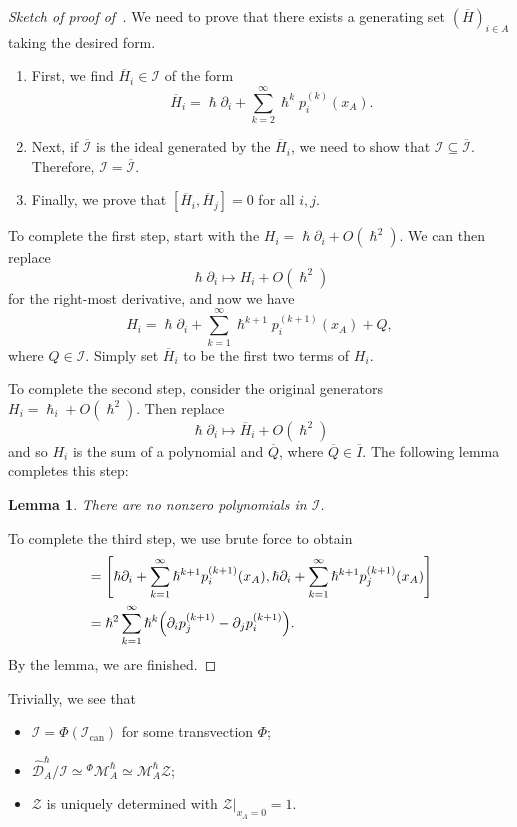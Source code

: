 \documentclass[leqno, openany]{memoir}
\newtheorem{lem}[thm]{Lemma}
\theoremstyle{definition}
\theoremstyle{remark}
\theoremstyle{plain}
\theoremstyle{definition}
\theoremstyle{remark}
\newcommand{\mc}[1]{\mathcal{#1}}
\newcommand{\mr}[1]{\mathrm{#1}}
\newcommand{\ol}[1]{\overline{#1}}
\newcommand{\wh}[1]{\widehat{#1}}
\begin{document}
\begin{proof}[Sketch of proof of~]
    We need to prove that there exists a generating set $(\ol{H})_{i \in A}$ taking the desired form.
    \begin{enumerate}
        \item First, we find $\ol{H}_i \in \mc{I}$ of the form
            \[ \ol{H}_i = \hslash \partial_i + \sum_{k=2}^{\infty} \hslash^k p_i^{(k)}(x_A). \]
        \item Next, if $\ol{\mc{I}}$ is the ideal generated by the $\ol{H}_i$, we need to show that $\mc{I} \subseteq \ol{\mc{I}}$. Therefore, $\mc{I} = \ol{\mc{I}}$.
        \item Finally, we prove that $[\ol{H}_i, \ol{H}_j] = 0$ for all $i, j$.
    \end{enumerate}

    To complete the first step, start with the $H_i = \hslash \partial_i + O(\hslash^2)$. We can then replace
    \[ \hslash \partial_i \mapsto H_i + O(\hslash^2) \]
    for the right-most derivative, and now we have
    \[ H_i = \hslash \partial_i + \sum_{k=1}^{\infty} \hslash^{k+1} p_i^{(k+1)}(x_A) + Q, \]
    where $Q \in \mc{I}$. Simply set $\ol{H}_i$ to be the first two terms of $H_i$.

    To complete the second step, consider the original generators $H_i = \hslash_i + O(\hslash^2)$. Then replace
    \[ \hslash \partial_i \mapsto \ol{H}_i + O(\hslash^2) \]
    and so $H_i$ is the sum of a polynomial and $\ol{Q}$, where $\ol{Q} \in \ol{I}$. The following lemma completes this step:
    \begin{lem}
        There are no nonzero polynomials in $\mc{I}$.
    \end{lem}
    
    To complete the third step, we use brute force to obtain
    \begin{align*}
        [\ol{H}_i, \ol{H}_j] &= \qty[\hslash \partial_i + \sum_{k=1}^{\infty} \hslash^{k+1} p_i^{(k+1)}(x_A), \hslash \partial_i + \sum_{k=1}^{\infty} \hslash^{k+1} p_j^{(k+1)}(x_A)] \\
        &= \hslash^2 \sum_{k=1}^{\infty} \hslash^k \qty(\partial_i p_j^{(k+1)} - \partial_j p_i^{(k+1)}).
    \end{align*}
    By the lemma, we are finished.
\end{proof}

Trivially, we see that
\begin{itemize}
    \item $\mc{I} = \Phi(\mc{I}_{\mr{can}})$ for some transvection $\Phi$;
    \item $\wh{\mc{D}}_A^{\hslash} / \mc{I} \simeq {}^{\Phi}\mc{M}_A^{\hslash} \simeq \mc{M}_A^{\hslash} \mc{Z}$;
    \item $\mc{Z}$ is uniquely determined with $\mc{Z} |_{x_A = 0} = 1$.
\end{itemize}
\end{document}
